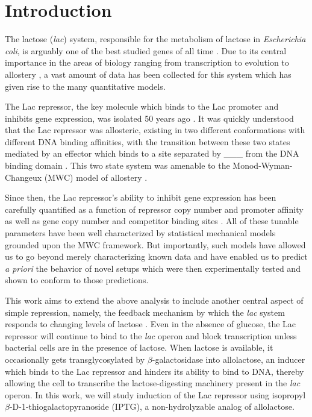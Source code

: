 \section*{Introduction}

The lactose (\textit{lac}) system, responsible for the metabolism of lactose in
\textit{Escherichia coli}, is arguably one of the best studied genes of all time
\cite{MullerHill1996a}. Due to its central importance in the areas of biology
ranging from transcription to evolution to allostery \cite{Razo-Mejia2014}
, a vast amount of data has been collected for this
system which has given rise to the many quantitative models.

The Lac repressor, the key molecule which binds to the Lac promoter and inhibits
gene expression, was isolated 50 years ago \cite{Gilbert1966}. It was quickly
understood that the Lac repressor was allosteric, existing in two different
conformations with different DNA binding affinities, with the transition between
these two states mediated by an effector which binds to a site separated by
\_\_\_ 
from the DNA binding domain .
This two state system was amenable to the Monod-Wyman-Changeux (MWC) model of
allostery \cite{MONOD1965}.

Since then, the Lac repressor's ability to inhibit gene expression has been carefully quantified
as a function of repressor copy number and promoter affinity \cite{Garcia2011}
as well as gene copy number and competitor binding sites \cite{Weinert2014}. All
of these tunable parameters have been well characterized by statistical
mechanical models grounded upon the MWC framework. But importantly, such models
have allowed us to go beyond merely characterizing known data and have enabled
us to predict \textit{a priori} the behavior of novel setups which were then
experimentally tested and shown to conform to those predictions.

This work aims to extend the above analysis to include another central aspect of
simple repression, namely, the feedback mechanism by which the \textit{lac}
system responds to changing levels of lactose \cite{JACOB1961}. Even in the
absence of glucose, the Lac repressor will continue to bind to the \textit{lac}
operon and block transcription unless bacterial cells are in the presence of
lactose. When lactose is available, it occasionally gets transglycosylated by
$\beta$-galactosidase into allolactose, an inducer which binds to the Lac
repressor and hinders its ability to bind to DNA, thereby allowing the cell to
transcribe the lactose-digesting machinery present in the \textit{lac} operon.
In this work, we will study induction of the Lac repressor using isopropyl
$\beta$-D-1-thiogalactopyranoside (IPTG), a non-hydrolyzable analog of
allolactose.

